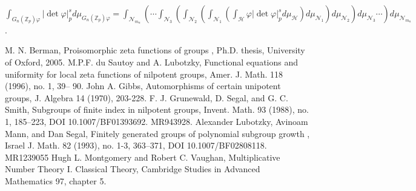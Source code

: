 \documentclass[12pt]{article}
\begin{document}
$\displaystyle\int_{G_n(\mathbb{Z}_p)\varphi}|\det\varphi|_p^sd\mu_{G_n(\mathbb{Z}_p)\varphi}=\displaystyle\int_{\mathcal{N}_{m_n}}\left(\cdots\displaystyle\int_{\mathcal{N}_3}\left(\displaystyle\int_{\mathcal{N}_2}\left(\displaystyle\int_{\mathcal{N}_1}\left(\displaystyle\int_{\mathcal{H}}\varphi|\det\varphi|_p^sd\mu_{\mathcal{H}}\right)d\mu_{\mathcal{N}_1}\right)d\mu_{\mathcal{N}_2}\right)d\mu_{\mathcal{N}_3}\cdots\right)d\mu_{\mathcal{N}_{m_n}}$.
\begin{thebibliography}{2}
 M. N. Berman,
Proisomorphic zeta functions of groups
, Ph.D. thesis, University of Oxford,
2005.
 M.P.F. du Sautoy and A. Lubotzky, Functional equations and uniformity for
local zeta functions of nilpotent groups, Amer. J. Math. 118 (1996), no. 1, 39–
90.
 John A. Gibbs, Automorphisms of certain unipotent groups, J. Algebra 14 (1970), 203-228.
 F. J. Grunewald, D. Segal, and G. C. Smith, Subgroups of finite index in nilpotent groups,
Invent. Math. 93 (1988), no. 1, 185–223, DOI 10.1007/BF01393692. MR943928.
 Alexander Lubotzky, Avinoam Mann, and Dan Segal,
Finitely generated groups of polynomial
subgroup growth
, Israel J. Math.
82
(1993), no. 1-3, 363–371, DOI 10.1007/BF02808118.
MR1239055
 Hugh L. Montgomery and Robert C. Vaughan, Multiplicative Number Theory I. Classical Theory, Cambridge Studies in Advanced Mathematics 97, chapter 5.
\end{thebibliography}
\end{document}
